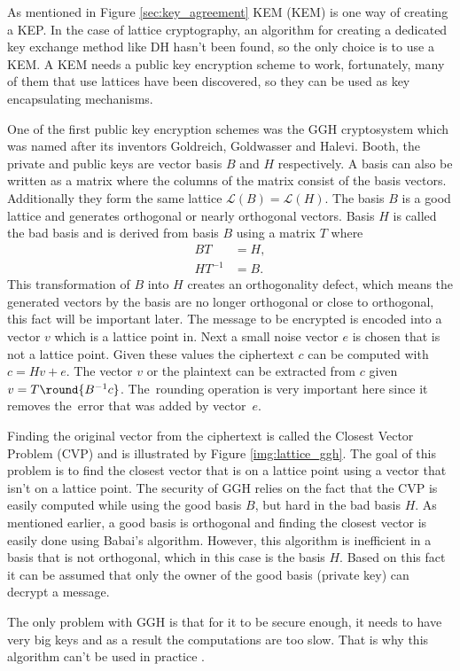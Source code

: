 As mentioned in Figure \ref{sec:key_agreement} KEM (\acl{KEM}) is one way of creating a KEP. In the case of lattice cryptography, an algorithm for creating a dedicated key exchange method like DH hasn't been found, so the only choice is to use a KEM. A KEM needs a public key encryption scheme to work, fortunately, many of them that use lattices have been discovered, so they can be used as key encapsulating mechanisms.

One of the first public key encryption schemes was the GGH cryptosystem which was named after its inventors Goldreich, Goldwasser and Halevi. Booth, the private and public keys are vector basis $B$ and $H$ respectively. A basis can also be written as a matrix where the columns of the matrix consist of the basis vectors. Additionally they form the same lattice $\mathcal{L}(B)=\mathcal{L}(H)$. The basis $B$ is a good lattice and generates orthogonal or nearly orthogonal vectors. Basis $H$ is called the bad basis and is derived from basis $B$ using a matrix $T$ where
\begin{equation}
  \begin{aligned}
    BT&=H, \\
    HT^{-1}&=B.
  \end{aligned}
\end{equation}
This transformation of $B$ into $H$ creates an orthogonality defect, which means the generated vectors by the basis are no longer orthogonal or close to orthogonal, this fact will be important later. The message to be encrypted is encoded into a vector $v$ which is a lattice point in. Next a small noise vector $e$ is chosen that is not a lattice point. Given these values the ciphertext $c$ can be computed with $c = Hv + e$. The vector $v$ or the plaintext can be extracted from $c$ given $v=T \round{B^{-1}c}$. The~rounding operation is very important here since it removes the~error that was added by vector~$e$. \cite{Bernstein2009}\cite{Goldreich1997}


Finding the original vector from the ciphertext is called the Closest Vector Problem (CVP) and is illustrated by Figure \ref{img:lattice_ggh}. The goal of this problem is to find the closest vector that is on a lattice point using a vector that isn't on a lattice point. The security of GGH relies on the fact that the CVP is easily computed while using the good basis $B$, but hard in the bad basis $H$. As mentioned earlier, a good basis is orthogonal and finding the closest vector is easily done using Babai's algorithm. However, this algorithm is inefficient in a basis that is not orthogonal, which in this case is the basis $H$. Based on this fact it can be assumed that only the owner of the good basis (private key) can decrypt a message. \cite{Goldreich1997}

The only problem with GGH is that for it to be secure enough, it needs to have very big keys and as a result the computations are too slow. That is why this algorithm can't be used in practice \cite{Bernstein2009}.
